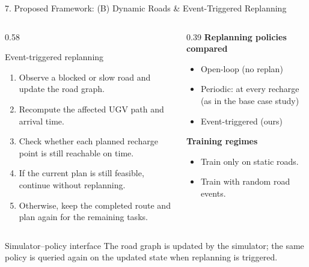 \documentclass[aspectratio=169,10pt]{beamer}
\begin{document}
\begin{frame}{7. Proposed Framework: (B) Dynamic Roads \& Event-Triggered Replanning}
\small
\begin{columns}[T]
\begin{column}{0.58\textwidth}
\begin{block}{Event-triggered replanning}
\footnotesize
\begin{enumerate}
  \item Observe a blocked or slow road and update the road graph.
  \item Recompute the affected UGV path and arrival time.
  \item Check whether each planned recharge point is still reachable on time.
  \item If the current plan is still feasible, continue without replanning.
  \item Otherwise, keep the completed route and plan again for the remaining tasks.
\end{enumerate}
\end{block}
\end{column}
\begin{column}{0.39\textwidth}
\textbf{Replanning policies compared}
\begin{itemize}
  \item Open-loop (no replan)
  \item Periodic: at every recharge (as in the base case study)
  \item Event-triggered (ours)
\end{itemize}
\vspace{2mm}
\textbf{Training regimes}
\begin{itemize}
  \item Train only on static roads.
  \item Train with random road events.
\end{itemize}
\end{column}
\end{columns}
\vspace{1mm}
\begin{block}{Simulator--policy interface}
\scriptsize
The road graph is updated by the simulator; the same policy is queried again on the updated state when replanning is triggered.
\end{block}
\end{frame}
\end{document}
